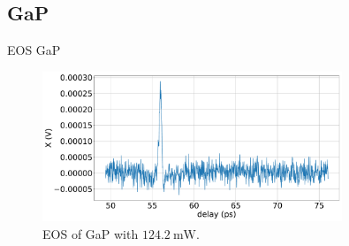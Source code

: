 \documentclass[aspectratio=1610, 9pt]{beamer}
\begin{document}
\subsection{GaP}
\begin{frame}{EOS GaP}
  \begin{figure}
    \includegraphics[width=0.8\textwidth]{images/GaP14_55_42normalX.pdf}
    \caption{\textcolor{tugreen}{EOS} of GaP with $\SI{124.2}{\milli\W}$.}
  \end{figure}
\end{frame}
\end{document}
